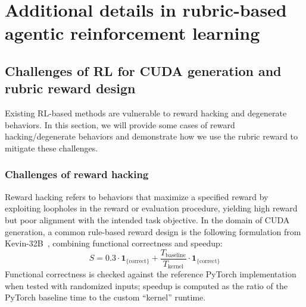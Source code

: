 





\section{Additional details in rubric-based agentic reinforcement learning}
\label{app:rl}
\subsection{Challenges of RL for CUDA generation and rubric reward design}

Existing RL-based methods are vulnerable to reward hacking and degenerate behaviors. In this section, we will provide some cases of reward hacking/degenerate behaviors and demonstrate how we use the rubric reward to mitigate these challenges.

\subsubsection{Challenges of reward hacking}
\label{app:rewardhack}
Reward hacking refers to behaviors that maximize a specified reward by exploiting loopholes in the reward or evaluation procedure, yielding high reward but poor alignment with the intended task objective. In the domain of CUDA generation, a common rule-based reward design is the following formulation from Kevin-32B~\cite{kevin}, combining functional correctness and speedup:
$$
\label{kevinreward}
S = 0.3 \cdot \mathbf{1}_{\{\text{correct}\}} + \frac{T_{\text{baseline}}}{T_{\text{kernel}}}  \cdot \mathbf{1}_{\{\text{correct}\}}
$$
Functional correctness is checked against the reference PyTorch implementation when tested with randomized inputs; speedup is computed as the ratio of the PyTorch baseline time to the custom “kernel” runtime. 

